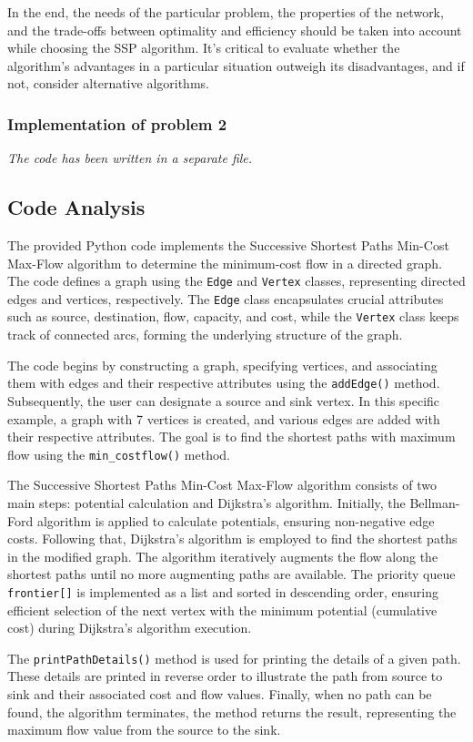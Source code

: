 \documentclass[a4paper]{article}
\begin{document}
		In the end, the needs of the particular problem, the properties of the network, and the trade-offs between optimality and efficiency should be taken into account while choosing the SSP algorithm. It's critical to evaluate whether the algorithm's advantages in a particular situation outweigh its disadvantages, and if not, consider alternative algorithms.
		\subsubsection{Implementation of problem 2}
		\emph{The code has been written in a separate file.}
		\subsection{Code Analysis}
		The provided Python code implements the Successive Shortest Paths Min-Cost Max-Flow algorithm to determine the minimum-cost flow in a directed graph. The code defines a graph using the \texttt{Edge} and \texttt{Vertex} classes, representing directed edges and vertices, respectively. The \texttt{Edge} class encapsulates crucial attributes such as source, destination, flow, capacity, and cost, while the \texttt{Vertex} class keeps track of connected arcs, forming the underlying structure of the graph.
		
		The code begins by constructing a graph, specifying vertices, and associating them with edges and their respective attributes using the \texttt{addEdge()} method. Subsequently, the user can designate a source and sink vertex. In this specific example, a graph with 7 vertices is created, and various edges are added with their respective attributes. The goal is to find the shortest paths with maximum flow using the \texttt{min\_costflow()} method.
		
		The Successive Shortest Paths Min-Cost Max-Flow algorithm consists of two main steps: potential calculation and Dijkstra's algorithm. Initially, the Bellman-Ford algorithm is applied to calculate potentials, ensuring non-negative edge costs. Following that, Dijkstra's algorithm is employed to find the shortest paths in the modified graph. The algorithm iteratively augments the flow along the shortest paths until no more augmenting paths are available. The priority queue \texttt{frontier[]} is implemented as a list and sorted in descending order, ensuring efficient selection of the next vertex with the minimum potential (cumulative cost) during Dijkstra's algorithm execution.
		
		The \texttt{printPathDetails()} method is used for printing the details of a given path. These details are printed in reverse order to illustrate the path from source to sink and their associated cost and flow values. Finally, when no path can be found, the algorithm terminates, the method returns the result, representing the maximum flow value from the source to the sink.
\end{document}
